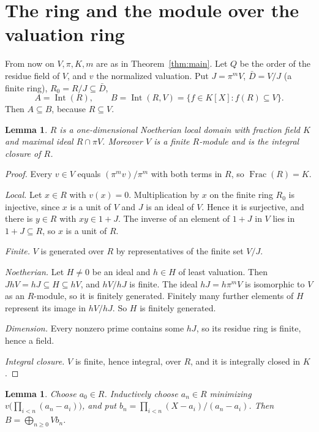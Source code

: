 \documentclass[11pt,a4paper]{article}
\theoremstyle{plain}
\newtheorem{lemma}[theorem]{Lemma}
\theoremstyle{remark}
\newcommand{\Int}{\operatorname{Int}}
\begin{document}
\section{The ring and the module over the valuation ring}

From now on $V,\pi,K,m$ are as in Theorem~\ref{thm:main}. Let $Q$ be the order of the residue field of $V$, and $v$
the normalized valuation. Put $J=\pi^mV$, $\bar D=V/J$ (a finite ring), $R_0=R/J\subseteq\bar D$,
\[
 A=\Int(R),\qquad B=\Int(R,V)=\{f\in K[X]:f(R)\subseteq V\}.
\]
Then $A\subseteq B$, because $R\subseteq V$.

\begin{lemma}\label{lem:ring}
$R$ is a one-dimensional Noetherian local domain with fraction field $K$ and maximal ideal $R\cap\pi V$. Moreover
$V$ is a finite $R$-module and is the integral closure of $R$.
\end{lemma}

\begin{proof}
Every $v\in V$ equals $(\pi^mv)/\pi^m$ with both terms in $R$, so $\operatorname{Frac}(R)=K$.

\emph{Local.} Let $x\in R$ with $v(x)=0$. Multiplication by $x$ on the finite ring $R_0$ is injective, since $x$ is a
unit of $V$ and $J$ is an ideal of $V$. Hence it is surjective, and there is $y\in R$ with $xy\in1+J$. The inverse of
an element of $1+J$ in $V$ lies in $1+J\subseteq R$, so $x$ is a unit of $R$.

\emph{Finite.} $V$ is generated over $R$ by representatives of the finite set $V/J$.

\emph{Noetherian.} Let $H\neq0$ be an ideal and $h\in H$ of least valuation. Then $JhV=hJ\subseteq H\subseteq hV$,
and $hV/hJ$ is finite. The ideal $hJ=h\pi^mV$ is isomorphic to $V$ as an $R$-module, so it is finitely generated. Finitely many further elements of $H$ represent its image in
$hV/hJ$. So $H$ is finitely generated.

\emph{Dimension.} Every nonzero prime contains some $hJ$, so its residue ring is finite, hence a field.

\emph{Integral closure.} $V$ is finite, hence integral, over $R$, and it is integrally closed in $K$.
\end{proof}

\begin{lemma}\label{lem:newton}
Choose $a_0\in R$. Inductively choose $a_n\in R$ minimizing $v\bigl(\prod_{i<n}(a_n-a_i)\bigr)$, and put
$b_n=\prod_{i<n}(X-a_i)/(a_n-a_i)$. Then $B=\bigoplus_{n\geq0}Vb_n$.
\end{lemma}
\end{document}
